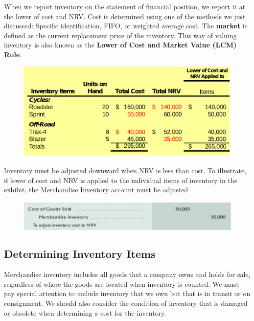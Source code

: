 \documentclass[../main.tex]{subfiles}
\begin{document}
	When we report inventory on the statement of financial position, we report 
	it at the lower of cost and NRV. Cost is determined using one of the 
	methods we just discussed: Specific identification, FIFO, or weighted 
	average cost. The \textbf{market} is defined as the current replacement 
	price of the inventory. This way of valuing inventory is also known as the 
	\textbf{Lower of Cost and Market Value (LCM) Rule}.
	
	\begin{figure}[ht]
		\centering
		\includegraphics[width=\columnwidth]{images/c7/lcm_eg.png}
	\end{figure}
	
	Inventory must be adjusted downward when NRV is less than cost. To 
	illustrate, if lower of cost and NRV is applied to the individual items of 
	inventory in the exhibit, the Merchandise Inventory account must be adjusted
	
	\begin{figure}[ht]
		\centering
		\includegraphics[width=\columnwidth]{images/c7/nrv_adjustment.png}
	\end{figure}
	
	\subsection{Determining Inventory Items}
	
	Merchandise inventory includes all goods that a company owns and holds for 
	sale, regardless of where the goods are located when inventory is counted. 
	We must pay special attention to include inventory that we own but that is 
	in transit or on consignment. We should also consider the condition of 
	inventory that is damaged or obsolete when determining a cost for the 
	inventory.
	
\end{document}
